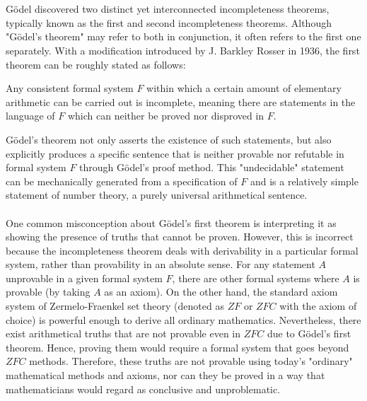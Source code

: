 \documentclass[10pt,a4paper]{article}
\newcounter{theo}
\begin{document}
                            \\
                            \\
                            Gödel discovered two distinct yet interconnected incompleteness theorems, typically known as the first and second incompleteness theorems. Although "Gödel's theorem" may refer to both in conjunction, it often refers to the first one separately. With a modification introduced by J. Barkley Rosser in 1936, the first theorem can be roughly stated as follows:
                            \begin{qt}
                                Any consistent formal system $F$ within which a certain amount of elementary arithmetic can be carried out is incomplete, meaning there are statements in the language of $F$ which can neither be proved nor disproved in $F$.
                            \end{qt}
                            Gödel's theorem not only asserts the existence of such statements, but also explicitly produces a specific sentence that is neither provable nor refutable in formal system $F$ through Gödel's proof method. This "undecidable" statement can be mechanically generated from a specification of $F$ and is a relatively simple statement of number theory, a purely universal arithmetical sentence.
                            \\
                            \\
                            One common misconception about Gödel's first theorem is interpreting it as showing the presence of truths that cannot be proven. However, this is incorrect because the incompleteness theorem deals with derivability in a particular formal system, rather than provability in an absolute sense. For any statement $A$ unprovable in a given formal system $F$, there are other formal systems where $A$ is provable (by taking $A$ as an axiom). On the other hand, the standard axiom system of Zermelo-Fraenkel set theory (denoted as $ZF$ or $ZFC$ with the axiom of choice) is powerful enough to derive all ordinary mathematics. Nevertheless, there exist arithmetical truths that are not provable even in $ZFC$ due to Gödel's first theorem. Hence, proving them would require a formal system that goes beyond $ZFC$ methods. Therefore, these truths are not provable using today's "ordinary" mathematical methods and axioms, nor can they be proved in a way that mathematicians would regard as conclusive and unproblematic.\cite{Hajek2007-fq}
                            \\
\end{document}
